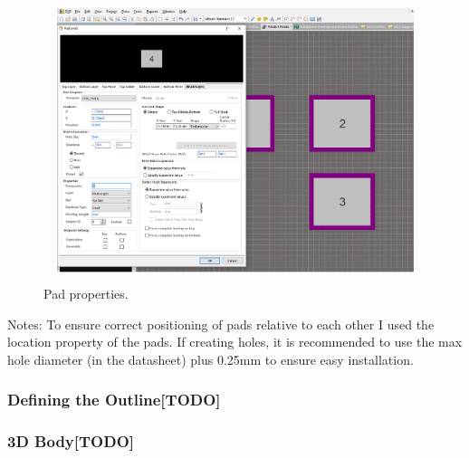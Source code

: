 \documentclass{report}
\begin{document}
	\begin{figure}[H]	
		\centering
		\includegraphics[width=16cm, height=8cm]{pics/pad_creation.png}
		\caption{Pad properties.}
		\label{pad_menu}
	\end{figure}

	Notes: To ensure correct positioning of pads relative to each other I used the location property of the pads. If creating holes, it is recommended to use the max hole diameter (in the datasheet) plus 0.25mm to ensure easy installation.
	
	\subsubsection{Defining the Outline[TODO]}
	\subsubsection{3D Body[TODO]}
\end{document}

